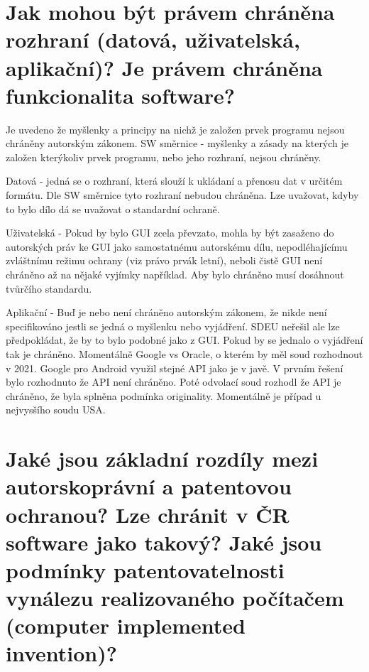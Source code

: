 \vspace{0.5cm} 
\section{Jak mohou být právem chráněna rozhraní (datová, uživatelská, aplikační)? Je právem chráněna funkcionalita software?}

Je uvedeno že myšlenky a principy na nichž je založen prvek programu nejsou chráněny autorským zákonem. SW směrnice - myšlenky a zásady na kterých je založen kterýkoliv prvek programu, nebo jeho rozhraní, nejsou chráněny. 

Datová - jedná se o rozhraní, která slouží k ukládaní a přenosu dat v určitém formátu. Dle SW směrnice tyto rozhraní nebudou chráněna. Lze uvažovat, kdyby to bylo dílo dá se uvažovat o standardní ochraně.

Uživatelská - Pokud by bylo GUI zcela převzato, mohla by být zasaženo do autorských práv ke GUI jako samostatnému autorskému dílu, nepodléhajícímu zvláštnímu režimu ochrany (viz právo prvák letní), neboli čistě GUI není chráněno až na nějaké vyjímky například. Aby bylo chráněno musí dosáhnout tvůrčího standardu.

Aplikační - Buď je nebo není chráněno autorským zákonem, že nikde není specifikováno jestli se jedná o myšlenku nebo vyjádření. SDEU neřešil ale lze předpokládat, že by to bylo podobné jako z GUI. Pokud by se jednalo o vyjádření tak je chráněno. Momentálně Google vs Oracle, o kterém by měl soud rozhodnout v 2021. Google pro Android využil stejné API jako je v javě. V prvním řešení bylo rozhodnuto že API není chráněno. Poté odvolací soud rozhodl že API je chráněno, že byla splněna podmínka originality. Momentálně je případ u nejvysšího soudu USA.


\vspace{0.5cm} 
\section{Jaké jsou základní rozdíly mezi autorskoprávní a patentovou ochranou? Lze chránit v ČR software jako takový? Jaké jsou podmínky patentovatelnosti vynálezu realizovaného počítačem (computer implemented invention)?}

